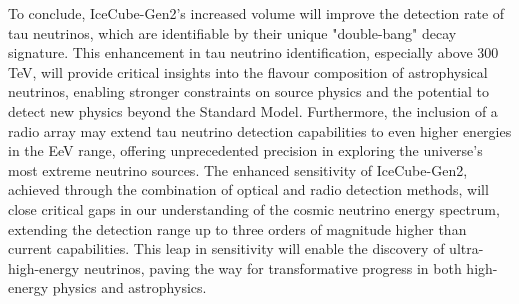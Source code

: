 To conclude, IceCube-Gen2's increased volume will improve the detection rate of tau neutrinos, which are identifiable by their unique "double-bang" decay signature. This enhancement in tau neutrino identification, especially above 300 TeV, will provide critical insights into the flavour composition of astrophysical neutrinos, enabling stronger constraints on source physics and the potential to detect new physics beyond the Standard Model. Furthermore, the inclusion of a radio array may extend tau neutrino detection capabilities to even higher energies in the EeV range, offering unprecedented precision in exploring the universe's most extreme neutrino sources. The enhanced sensitivity of IceCube-Gen2, achieved through the combination of optical and radio detection methods, will close critical gaps in our understanding of the cosmic neutrino energy spectrum, extending the detection range up to three orders of magnitude higher than current capabilities. This leap in sensitivity will enable the discovery of ultra-high-energy neutrinos, paving the way for transformative progress in both high-energy physics and astrophysics. 